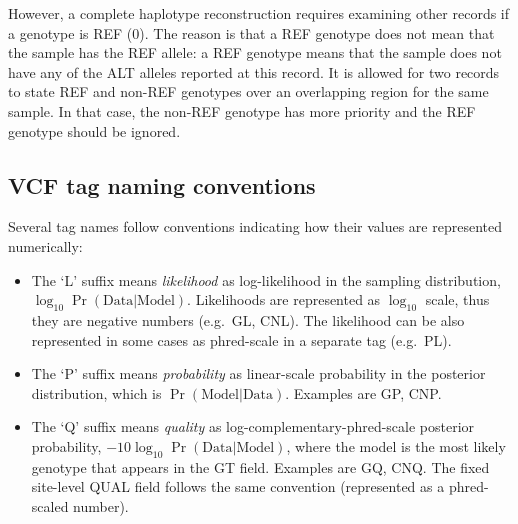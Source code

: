 \documentclass[8pt]{article}
\begin{document}
However, a complete haplotype reconstruction requires examining other records if a genotype is REF (0). The reason is that a REF genotype does not mean that the sample has the REF allele: a REF genotype means that the sample does not have any of the ALT alleles reported at this record. It is allowed for two records to state REF and non-REF genotypes over an overlapping region for the same sample. In that case, the non-REF genotype has more priority and the REF genotype should be ignored.


\subsection{VCF tag naming conventions}
Several tag names follow conventions indicating how their values are represented numerically:
\begin{itemize}
    \item The `L' suffix means \emph{likelihood} as log-likelihood in the sampling distribution, $\log_{10} \Pr(\mathrm{Data}|\mathrm{Model})$.
    Likelihoods are represented as $\log_{10}$ scale, thus they are negative numbers (e.g.\ GL, CNL).
    The likelihood can be also represented in some cases as phred-scale in a separate tag (e.g.\ PL).

    \item The `P' suffix means \emph{probability} as linear-scale probability in the posterior distribution, which is $\Pr(\mathrm{Model}|\mathrm{Data})$. Examples are GP, CNP.

    \item The `Q' suffix means \emph{quality} as log-complementary-phred-scale posterior probability, $-10 \log_{10} \Pr(\mathrm{Data}|\mathrm{Model})$, where the model is the most likely genotype that appears in the GT field.
    Examples are GQ, CNQ.
    The fixed site-level QUAL field follows the same convention (represented as a phred-scaled number).
\end{itemize}
\end{document}
